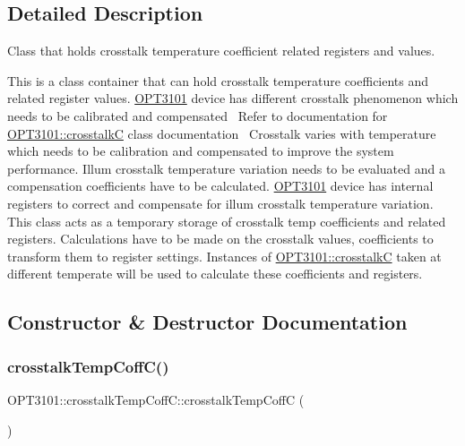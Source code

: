 \subsection{Detailed Description}
Class that holds crosstalk temperature coefficient related registers and values. 

This is a class container that can hold crosstalk temperature coefficients and related register values. \mbox{\hyperlink{namespace_o_p_t3101}{O\+P\+T3101}} device has different crosstalk phenomenon which needs to be calibrated and compensated~\newline
 Refer to documentation for \mbox{\hyperlink{class_o_p_t3101_1_1crosstalk_c}{O\+P\+T3101\+::crosstalkC}} class documentation~\newline
 Crosstalk varies with temperature which needs to be calibration and compensated to improve the system performance. Illum crosstalk temperature variation needs to be evaluated and a compensation coefficients have to be calculated. \mbox{\hyperlink{namespace_o_p_t3101}{O\+P\+T3101}} device has internal registers to correct and compensate for illum crosstalk temperature variation. This class acts as a temporary storage of crosstalk temp coefficients and related registers. Calculations have to be made on the crosstalk values, coefficients to transform them to register settings. Instances of \mbox{\hyperlink{class_o_p_t3101_1_1crosstalk_c}{O\+P\+T3101\+::crosstalkC}} taken at different temperate will be used to calculate these coefficients and registers. 

\subsection{Constructor \& Destructor Documentation}
\mbox{\label{class_o_p_t3101_1_1crosstalk_temp_coff_c_a3e910a6053a8cbffb8d18868ade903b5}} 
\subsubsection{\texorpdfstring{crosstalk\+Temp\+Coff\+C()}{crosstalkTempCoffC()}}
{\footnotesize\ttfamily O\+P\+T3101\+::crosstalk\+Temp\+Coff\+C\+::crosstalk\+Temp\+CoffC (\begin{DoxyParamCaption}{ }\end{DoxyParamCaption})}



